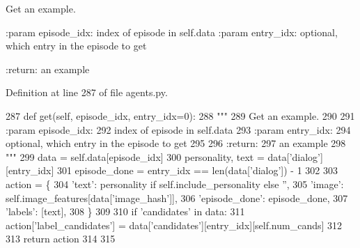 \begin{DoxyVerb}Get an example.

:param episode_idx:
    index of episode in self.data
:param entry_idx:
    optional, which entry in the episode to get

:return:
    an example
\end{DoxyVerb}
 

Definition at line 287 of file agents.\+py.


\begin{DoxyCode}
287     \textcolor{keyword}{def }get(self, episode\_idx, entry\_idx=0):
288         \textcolor{stringliteral}{"""}
289 \textcolor{stringliteral}{        Get an example.}
290 \textcolor{stringliteral}{}
291 \textcolor{stringliteral}{        :param episode\_idx:}
292 \textcolor{stringliteral}{            index of episode in self.data}
293 \textcolor{stringliteral}{        :param entry\_idx:}
294 \textcolor{stringliteral}{            optional, which entry in the episode to get}
295 \textcolor{stringliteral}{}
296 \textcolor{stringliteral}{        :return:}
297 \textcolor{stringliteral}{            an example}
298 \textcolor{stringliteral}{        """}
299         data = self.data[episode\_idx]
300         personality, text = data[\textcolor{stringliteral}{'dialog'}][entry\_idx]
301         episode\_done = entry\_idx == len(data[\textcolor{stringliteral}{'dialog'}]) - 1
302 
303         action = \{
304             \textcolor{stringliteral}{'text'}: personality \textcolor{keywordflow}{if} self.include\_personality \textcolor{keywordflow}{else} \textcolor{stringliteral}{''},
305             \textcolor{stringliteral}{'image'}: self.image\_features[data[\textcolor{stringliteral}{'image\_hash'}]],
306             \textcolor{stringliteral}{'episode\_done'}: episode\_done,
307             \textcolor{stringliteral}{'labels'}: [text],
308         \}
309 
310         \textcolor{keywordflow}{if} \textcolor{stringliteral}{'candidates'} \textcolor{keywordflow}{in} data:
311             action[\textcolor{stringliteral}{'label\_candidates'}] = data[\textcolor{stringliteral}{'candidates'}][entry\_idx][self.num\_cands]
312 
313         \textcolor{keywordflow}{return} action
314 
315 
\end{DoxyCode}
\mbox{\label{classparlai_1_1tasks_1_1image__chat_1_1agents_1_1ImageChatTestTeacher_a538e34213530b244b4cc4e8c90de7af2}} 
